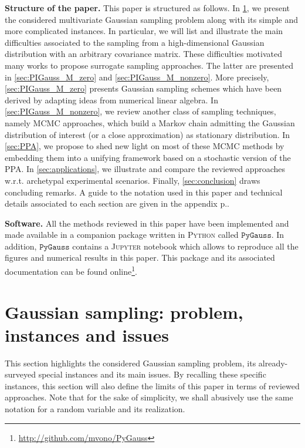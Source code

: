 \documentclass[nohypdvips,onefignum,onetabnum]{siamart171218}
\begin{document}
\noindent\textbf{Structure of the paper.}
This paper is structured as follows.
In \cref{sec:Gaussian_sampling}, we present the considered multivariate Gaussian sampling problem along with its simple and more complicated instances.
In particular, we will list and illustrate the main difficulties associated to the sampling from a high-dimensional Gaussian distribution with an arbitrary covariance matrix. These difficulties motivated many works to propose surrogate sampling approaches.
The latter are presented in \cref{sec:PIGauss_M_zero} and \cref{sec:PIGauss_M_nonzero}.
More precisely, \cref{sec:PIGauss_M_zero} presents Gaussian sampling schemes which have been derived by adapting ideas from numerical linear algebra. 
In \cref{sec:PIGauss_M_nonzero}, we review another class of sampling techniques, namely MCMC approaches, which build a Markov chain admitting the Gaussian distribution of interest (or a close approximation) as stationary distribution.
In \cref{sec:PPA}, we propose to shed new light on most of these MCMC methods by embedding them into a unifying framework based on a stochastic version of the PPA.
In \cref{sec:applications}, we illustrate and compare the reviewed approaches w.r.t. archetypal experimental scenarios.
Finally, \cref{sec:conclusion} draws concluding remarks.
A guide to the notation used in this paper and technical details associated to each section are given in the appendix p.\pageref{appendix_notations}.

\noindent\textbf{Software.}
All the methods reviewed in this paper have been implemented and made available in a companion package written in \textsc{Python}\xspace called $\texttt{PyGauss}$.
In addition, $\texttt{PyGauss}$ contains a \textsc{Jupyter} notebook which allows to reproduce all the figures and numerical results in this paper.
This package and its associated documentation can be found online\footnote{\url{http://github.com/mvono/PyGauss}}.


\section{Gaussian sampling: problem, instances and issues}
\label{sec:Gaussian_sampling}

This section highlights the considered Gaussian sampling problem, its already-surveyed special instances and its main issues. 
By recalling these specific instances, this section will also define the limits of this paper in terms of reviewed approaches.
Note that for the sake of simplicity, we shall abusively use the same notation for a random variable and its realization.
\end{document}
